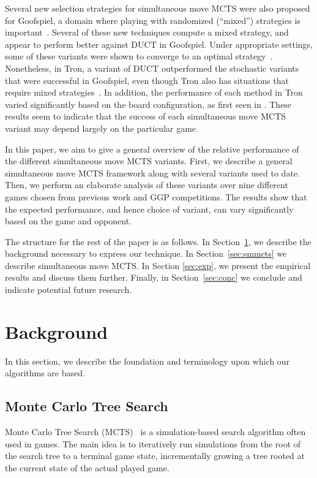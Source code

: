 \documentclass[conference]{IEEEtran}
\begin{document}
Several new selection strategies for simultaneous move MCTS were also proposed for Goofspiel, 
a domain where playing with randomized (``mixed'') strategies is important~\cite{Lanctot13Goofspiel}.
Several of these new techniques compute a mixed strategy, and appear to perform better against DUCT in Goofspiel. 
Under appropriate settings, some of these variants were shown to converge to an optimal strategy~\cite{Lisy13Computing}. 
Nonetheless, in Tron, a variant of DUCT outperformed the stochastic variants that were successful in Goofspiel, even though Tron 
also has situations that require mixed strategies~\cite{Lanctot13Tron}. 
In addition, the performance of each method in Tron varied significantly based on the board configuration, as first seen 
in \cite{DenTeuling12Tron}.
These results seem to indicate that the success of each simultaneous move MCTS variant may depend largely on the particular game. 

In this paper, we aim to give a general overview of the relative performance of the different simultaneous move MCTS variants. 
First, we describe a general simultaneous move MCTS framework along with several variants used to date. Then, we perform an 
elaborate analysis of these variants over nine different games chosen from previous work and GGP competitions. 
The results show that the expected performance, and hence choice of variant, can vary significantly based on the game and opponent. 

The structure for the rest of the paper is as follows. In Section~\ref{sec:background}, we describe the background necessary to 
express our technique. In Section~\ref{sec:smmcts} we describe simultaneous move MCTS. In Section \ref{sec:exp}, we present 
the empirical results and discuss them further. Finally, in Section~\ref{sec:conc} we conclude and indicate potential future research.

\section{Background}
\label{sec:background}

In this section, we describe the foundation and terminology upon which our algorithms are based. 

\subsection{Monte Carlo Tree Search}

Monte Carlo Tree Search (MCTS)~\cite{Coulom06Efficient,Kocsis06Bandit} is a simulation-based 
search algorithm often used in games. The main idea is to iteratively run simulations from the root of the search tree to a terminal 
game state, incrementally growing a tree rooted at the current state of the actual played game. 
\end{document}
